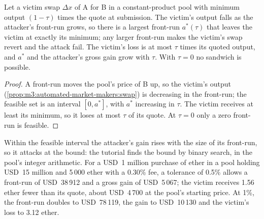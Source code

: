 \begin{proposition}\label{prop:m3:maximal-extractable-value:bound}
Let a victim swap $\Delta x$ of  A for  B in a constant-product pool with minimum output $(1 - \tau)$ times the
quote at submission. The victim's output falls as the attacker's front-run grows, so there is a largest front-run
$a^*(\tau)$ that leaves the victim at exactly its minimum; any larger front-run makes the victim's swap revert and the
attack fail. The victim's loss is at most $\tau$ times its quoted output, and $a^*$ and the attacker's gross gain grow with
$\tau$. With $\tau = 0$ no sandwich is possible.
\end{proposition}

\begin{proof}
A front-run moves the pool's price of B up, so the victim's output (\cref{prop:m3:automated-market-makers:swap}) is decreasing
in the front-run; the feasible set is an interval $[0, a^*]$, with $a^*$ increasing in $\tau$. The victim receives at least its
minimum, so it loses at most $\tau$ of its quote. At $\tau = 0$ only a zero front-run is feasible.
\end{proof}

Within the feasible interval the attacker's gain rises with the size of its front-run, so it attacks at the bound: the tutorial
finds the bound by binary search, in the pool's integer arithmetic. For a USD~1 million purchase of ether in a pool holding
USD~15 million and 5\,000 ether with a 0.30\% fee, a tolerance of 0.5\% allows a front-run of USD~38\,912 and a gross gain of
USD~5\,067; the victim receives 1.56 ether fewer than its quote, about USD~4\,700 at the pool's starting price. At 1\%, the
front-run doubles to USD~78\,119, the gain to USD~10\,130 and the victim's loss to 3.12 ether.

